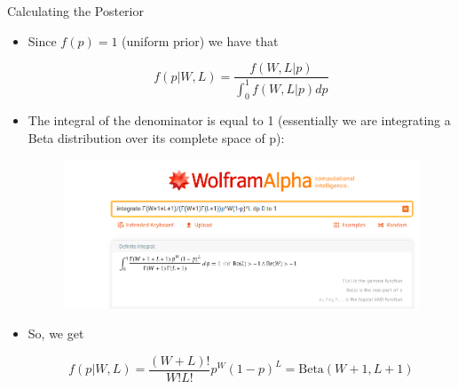 \documentclass[handout]{beamer}
\begin{document}
\begin{frame}{Calculating the Posterior}
\scriptsize{

\begin{itemize}


\item Since $f(p)=1$ (uniform prior) we have that

\begin{displaymath}
f(p|W,L) = \frac{f(W,L|p)}{\int_0^1f(W,L|p)dp} 
\end{displaymath}

\item The integral of the denominator is equal to 1 (essentially we are integrating a Beta distribution over its complete space of p):

\begin{figure}[h!]
	\centering
	\includegraphics[scale=0.25]{pics/wolphram.png}
\end{figure}

\item So, we get 

\begin{displaymath}
f(p|W,L) =  \frac{(W+L)!}{W!L!}p^W(1-p)^L = \text{Beta}(W+1 , L+1) 
\end{displaymath}


\end{itemize}

} 

\end{frame}
\end{document}
